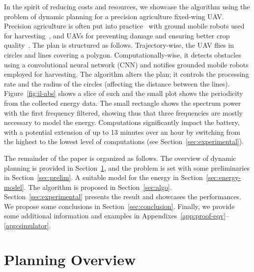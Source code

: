 \documentclass[letterpaper,10pt,conference]{ieeeconf}
\theoremstyle{definition}
\begin{document}
In the spirit of reducing costs and resources, we showcase the algorithm using the problem of dynamic planning for a precision agriculture fixed-wing UAV. Precision agriculture is often put into practice~\cite{hajjaj2014review} with ground mobile robots used for harvesting~\cite{qingchun2012study,dong2011development, de2011design, aljanobi2010setup, li2008analysis, edan2000robotic}, and UAVs for preventing damage and ensuring better crop quality~\cite{puri2017agriculture, daponte2019review}. The plan is structured as follows. Trajectory-wise, the UAV flies in circles and lines covering a polygon. Computationally-wise, it detects obstacles using a convolutional neural network (CNN) and notifies grounded mobile robots employed for harvesting. The algorithm alters the plan; it controls the processing rate and the radius of the circles (affecting the distance between the lines). Figure~\ref{fig:il-abs} shows a slice of such and the small plot shows the periodicity from the collected energy data. The small rectangle shows the spectrum power with the first frequency filtered, showing thus that three frequencies are mostly necessary to model the energy. Computations significantly impact the battery, with a potential extension of up to 13 minutes over an hour by switching from the highest to the lowest level of computations (see Section~\ref{sec:experimental}).

The remainder of the paper is organized as follows. The overview of dynamic planning is provided in Section~\ref{sec:prob}, and the problem is set with some preliminaries in Section~\ref{sec:prelim}. A suitable model for the energy in Section~\ref{sec:energy-model}. The algorithm is proposed in Section~\ref{sec:algo}. Section~\ref{sec:experimental} presents the result and showcases the performances. We propose some conclusions in Section~\ref{sec:conclusion}. Finally, we provide some additional information and examples in Appendixes~\ref{app:proof-eqv}--\ref{app:simulator}.


\section{Planning Overview}
\label{sec:prob}
 
\end{document}
